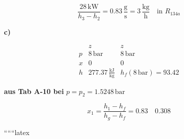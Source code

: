 \[
\frac{28 \, \text{kW}}{h_3 - h_2} = 0.83 \, \frac{\text{g}}{\text{s}} = \boxed{3 \, \frac{\text{kg}}{\text{h}}} \quad \text{in } R_{134a}
\]

\textbf{c)}

\[
\begin{array}{c|c|c}
 & z & z \\
p & 8 \, \text{bar} & 8 \, \text{bar} \\
x & 0 & 0 \\
h & 277.37 \, \frac{\text{kJ}}{\text{kg}} & h_f (8 \, \text{bar}) = 93.42
\end{array}
\]

\textbf{aus Tab A-10 bei} $p = p_2 = 1.5248 \, \text{bar}$

\[
x_1 = \frac{h_1 - h_f}{h_g - h_f} = \boxed{0.83} \quad \boxed{0.308}
\]

``````latex